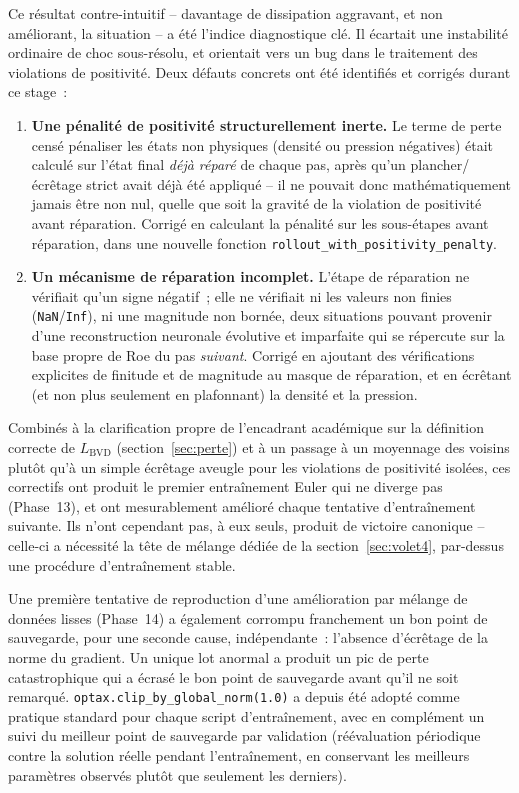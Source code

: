 \documentclass[11pt]{article}
\begin{document}
Ce résultat contre-intuitif -- davantage de dissipation aggravant, et non
améliorant, la situation -- a été l'indice diagnostique clé. Il écartait
une instabilité ordinaire de choc sous-résolu, et orientait vers un bug
dans le traitement des violations de positivité. Deux défauts concrets ont
été identifiés et corrigés durant ce stage~:

\begin{enumerate}
    \item \textbf{Une pénalité de positivité structurellement inerte.} Le
    terme de perte censé pénaliser les états non physiques (densité ou
    pression négatives) était calculé sur l'état final \emph{déjà
    réparé} de chaque pas, après qu'un plancher/écrêtage strict avait déjà
    été appliqué -- il ne pouvait donc mathématiquement jamais être non
    nul, quelle que soit la gravité de la violation de positivité avant
    réparation. Corrigé en calculant la pénalité sur les sous-étapes
    avant réparation, dans une nouvelle fonction
    \texttt{rollout\_with\_\allowbreak positivity\_\allowbreak penalty}.
    \item \textbf{Un mécanisme de réparation incomplet.} L'étape de
    réparation ne vérifiait qu'un signe négatif~; elle ne vérifiait ni les
    valeurs non finies (\texttt{NaN}/\texttt{Inf}), ni une magnitude non
    bornée, deux situations pouvant provenir d'une reconstruction
    neuronale évolutive et imparfaite qui se répercute sur la base propre
    de Roe du pas \emph{suivant}. Corrigé en ajoutant des vérifications
    explicites de finitude et de magnitude au masque de réparation, et en
    écrêtant (et non plus seulement en plafonnant) la densité et la
    pression.
\end{enumerate}

Combinés à la clarification propre de l'encadrant académique sur la
définition correcte de $L_{\text{BVD}}$ (section~\ref{sec:perte}) et à un
passage à un moyennage des voisins plutôt qu'à un simple écrêtage aveugle
pour les violations de positivité isolées, ces correctifs ont produit le
premier entraînement Euler qui ne diverge pas (Phase~13), et ont
mesurablement amélioré chaque tentative d'entraînement suivante. Ils
n'ont cependant pas, à eux seuls, produit de victoire canonique -- celle-ci
a nécessité la tête de mélange dédiée de la section~\ref{sec:volet4},
par-dessus une procédure d'entraînement stable.

Une première tentative de reproduction d'une amélioration par mélange de
données lisses (Phase~14) a également corrompu franchement un bon point
de sauvegarde, pour une seconde cause, indépendante~: l'absence
d'écrêtage de la norme du gradient. Un unique lot anormal a produit un pic
de perte catastrophique qui a écrasé le bon point de sauvegarde avant
qu'il ne soit remarqué. \texttt{optax.clip\_by\_global\_norm(1.0)} a
depuis été adopté comme pratique standard pour chaque script
d'entraînement, avec en complément un suivi du meilleur point de
sauvegarde par validation (réévaluation périodique contre la solution
réelle pendant l'entraînement, en conservant les meilleurs paramètres
observés plutôt que seulement les derniers).
\end{document}
